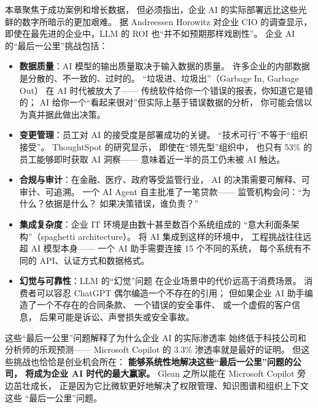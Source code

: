 \begin{warnbox}[企业 AI 的``最后一公里''挑战]
本章聚焦于成功案例和增长数据，
但必须指出，企业 AI 的实际部署远比这些光鲜的数字所暗示的更加艰难。
据 Andreessen Horowitz 对企业 CIO 的调查显示，
即使在最先进的企业中，LLM 的 ROI 也``并不如预期那样戏剧性''。
企业 AI 的``最后一公里''挑战包括：

\begin{itemize}[noitemsep]
  \item \textbf{数据质量}：AI 模型的输出质量取决于输入数据的质量。
        许多企业的内部数据是分散的、不一致的、过时的。
        ``垃圾进、垃圾出''（Garbage In, Garbage Out）
        在 AI 时代被放大了——
        传统软件给你一个错误的报表，你知道它是错的；
        AI 给你一个``看起来很对''但实际上基于错误数据的分析，
        你可能会信以为真并据此做出决策。
  \item \textbf{变更管理}：员工对 AI 的接受度是部署成功的关键。
        ``技术可行''不等于``组织接受''。
        ThoughtSpot 的研究显示，
        即使在``领先型''组织中，
        也只有 53\% 的员工能够即时获取 AI 洞察——
        意味着近一半的员工仍未被 AI 触达。
  \item \textbf{合规与审计}：在金融、医疗、政府等受监管行业，
        AI 的决策需要可解释、可审计、可追溯。
        一个 AI Agent 自主批准了一笔贷款——
        监管机构会问：``为什么？依据是什么？
        如果决策错误，谁负责？''
  \item \textbf{集成复杂度}：企业 IT 环境是由数十甚至数百个系统组成的
        ``意大利面条架构''（spaghetti architecture）。
        将 AI 集成到这样的环境中，
        工程挑战往往远超 AI 模型本身——
        一个 AI 助手需要连接 15 个不同的系统，
        每个系统有不同的 API、认证方式和数据格式。
  \item \textbf{幻觉与可靠性}：LLM 的``幻觉''问题
        在企业场景中的代价远高于消费场景。
        消费者可以容忍 ChatGPT 偶尔编造一个不存在的引用；
        但如果企业 AI 助手编造了一个不存在的合同条款、
        一个错误的安全事件、
        或一个虚假的客户信息，
        后果可能是诉讼、声誉损失或安全事故。
\end{itemize}

这些``最后一公里''问题解释了为什么企业 AI 的实际渗透率
始终低于科技公司和分析师的乐观预测——
Microsoft Copilot 的 3.3\% 渗透率就是最好的证明。
但这些挑战也恰恰是创业机会所在：
\textbf{能够系统性地解决这些``最后一公里''问题的公司，
将成为企业 AI 时代的最大赢家。}
Glean 之所以能在 Microsoft Copilot 旁边茁壮成长，
正是因为它比微软更好地解决了权限管理、知识图谱和组织上下文这些
``最后一公里''问题。
\end{warnbox}

